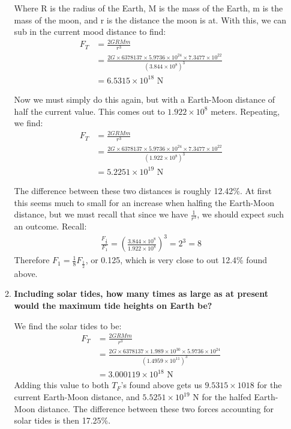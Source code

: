 \documentclass[10pt]{article}
\begin{document}
\begin{enumerate}
\begin{enumerate}
			Where R is the radius of the Earth, M is the mass of the Earth, m is the mass of the moon, and r is the distance the moon is at. With this, we can sub in the current mood distance to find:
			\begin{align*}
				F_T &= \frac{2GRMm}{r^3} \\
				&= \frac{2G \times 6378137 \times 5.9736 \times 10^{24} \times 7.3477 \times 10^{22}}{(3.844 \times 10^8)^3} \\
				&= 6.5315 \times 10^{18} \text{ N}
			\end{align*}
			
			Now we must simply do this again, but with a Earth-Moon distance of half the current value. This comes out to $1.922 \times 10^8$ meters. Repeating, we find:
			\begin{align*}
			F_T &= \frac{2GRMm}{r^3} \\
			&= \frac{2G \times 6378137 \times 5.9736 \times 10^{24} \times 7.3477 \times 10^{22}}{(1.922 \times 10^8)^3} \\
			&= 5.2251 \times 10^{19} \text{ N}
			\end{align*}
			
			The difference between these two distances is roughly 12.42\%. At first this seems much to small for an increase when halfing the Earth-Moon distance, but we must recall that since we have $\frac{1}{r^3}$, we should expect such an outcome. Recall:
			\begin{align*}
				\frac{F_\frac{1}{2}}{F_1} = \left( \frac{3.844 \times 10^8}{1.922 \times 10^8}\right)^3 = 2^3 = 8
			\end{align*}
			Therefore $F_1 = \frac{1}{8} F_\frac{1}{2}$, or 0.125, which is very close to out 12.4\% found above.
			
			\item  \textbf{Including solar tides, how many times as large as at present would the maximum tide heights on Earth be?}
			 
			We find the solar tides to be:
			\begin{align*}
				F_T &= \frac{2GRMm}{r^3} \\
				&= \frac{2G \times 6378137 \times 1.989 \times 10^{30} \times 5.9736 \times 10^{24}}{(1.4959 \times 10^11)^3} \\
				&= 3.000119 \times 10^{18} \text{ N}
			\end{align*}
			Adding this value to both $T_F$'s found above gets us $9.5315 \times 10{18}$ for the current Earth-Moon distance, and $5.5251\times 10^{19}$ N for the halfed Earth-Moon distance. The difference between these two forces accounting for solar tides is then 17.25\%.
			

\end{enumerate}
\end{enumerate}
\end{document}
